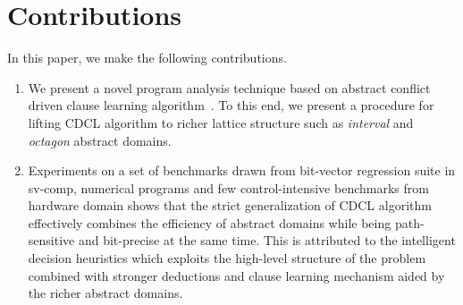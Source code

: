 \section{Contributions}
In this paper, we make the following contributions.
\begin{enumerate}
\item We present a novel program analysis technique based on 
abstract conflict driven clause learning algorithm~\cite{dhk2013-popl}.
To this end, we present a procedure for lifting CDCL algorithm to 
richer lattice structure such as {\em interval} and {\em octagon} 
abstract domains.  

\item  Experiments on a set of benchmarks drawn from bit-vector 
regression suite in sv-comp, numerical programs and few 
control-intensive benchmarks from hardware domain shows that 
the strict generalization of CDCL algorithm effectively combines 
the efficiency of abstract domains while being path-sensitive and 
bit-precise at the same time.  This is attributed to the intelligent 
decision heuristics which exploits the high-level structure of the 
problem combined with stronger deductions and clause learning 
mechanism aided by the richer abstract domains.
\end{enumerate}
